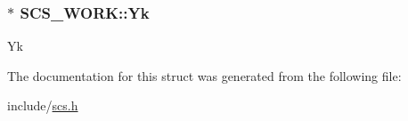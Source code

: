 \hypertarget{struct_s_c_s___w_o_r_k_a8fd4206b5c374331f6b0653209a0b1be}{
\subsubsection[{Yk}]{$\ast$ S\-C\-S\-\_\-\-W\-O\-R\-K\-::\-Yk}}\label{struct_s_c_s___w_o_r_k_a8fd4206b5c374331f6b0653209a0b1be}
Yk 

The documentation for this struct was generated from the following file\-:\begin{DoxyCompactItemize}
\item 
include/\hyperlink{scs_8h}{scs.\-h}\end{DoxyCompactItemize}
